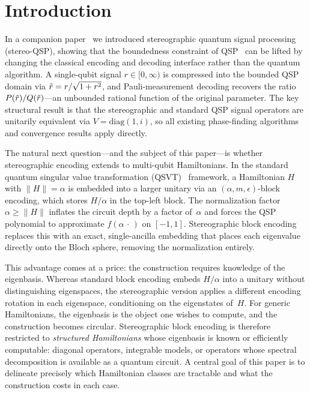 \section{Introduction}
\label{sec:introduction}


In a companion paper~\cite{KharaziLeytonOrtega2026a} we introduced
stereographic quantum signal processing (stereo-QSP), showing that
the boundedness constraint of QSP~\cite{LowChuang2017,GSLW2019}
can be lifted by changing the classical encoding and decoding
interface rather than the quantum algorithm.  A single-qubit signal
$r \in [0,\infty)$ is compressed into the bounded QSP domain via
$\tilde{r} = r/\sqrt{1+r^2}$, and Pauli-measurement decoding
recovers the ratio $P(\tilde{r})/Q(\tilde{r})$---an unbounded rational
function of the original parameter.  The key structural result is
that the stereographic and standard QSP signal operators are
unitarily equivalent via $V = \mathrm{diag}(1,i)$, so all existing
phase-finding algorithms and convergence results apply directly.


The natural next question---and the subject of this paper---is
whether stereographic encoding extends to multi-qubit Hamiltonians.
In the standard quantum singular value transformation
(QSVT)~\cite{GSLW2019} framework, a Hamiltonian
$H$ with $\|H\| = \alpha$ is embedded into a larger unitary via an
$(\alpha, m, \epsilon)$-block encoding, which stores $H/\alpha$ in
the top-left block.  The normalization factor
$\alpha \geq \|H\|$ inflates the circuit depth by a factor
of~$\alpha$ and forces the QSP polynomial to approximate
$f(\alpha\,\cdot\,)$ on $[-1,1]$.  Stereographic block encoding
replaces this with an exact, single-ancilla embedding that places
each eigenvalue directly onto the Bloch sphere, removing the
normalization entirely.


This advantage comes at a price: the construction requires
knowledge of the eigenbasis.  Whereas standard block encoding
embeds $H/\alpha$ into a unitary without distinguishing eigenspaces,
the stereographic version applies a different encoding rotation in
each eigenspace, conditioning on the eigenstates of~$H$.  For
generic Hamiltonians, the eigenbasis is the object one wishes to
compute, and the construction becomes circular.  Stereographic block
encoding is therefore restricted to \emph{structured Hamiltonians}
whose eigenbasis is known or efficiently computable: diagonal
operators, integrable models, or operators whose spectral
decomposition is available as a quantum circuit.  A central goal of
this paper is to delineate precisely which Hamiltonian classes are
tractable and what the construction costs in each case.

